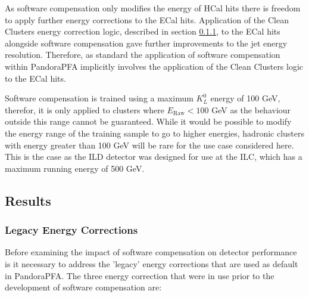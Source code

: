 As software compensation only modifies the energy of HCal \text{ } hits there is freedom to apply further energy corrections to the ECal \text{ } hits.  Application of the Clean Clusters energy correction logic, described in section \ref{sec:legacycorrections}, to the ECal \text{ } hits alongside software compensation gave further improvements to the jet energy resolution.  Therefore, as standard the application of software compensation within PandoraPFA implicitly involves the application of the Clean Clusters logic to the ECal \text{ } hits.  

Software compensation is trained using a maximum $K^{0}_{L}$ energy of 100 GeV, therefor, it is only applied to clusters where $E_{\text{Raw}} < 100$ GeV as the behaviour outside this range cannot be guaranteed.  While it would be possible to modify the energy range of the training sample to go to higher energies, hadronic clusters with energy greater than 100 GeV will be rare for the use case considered here.  This is the case as the ILD detector was designed for use at the ILC, which has a maximum running energy of 500 GeV.  


\subsection{Results}


\subsubsection{Legacy Energy Corrections}
\label{sec:legacycorrections}
Before examining the impact of software compensation on detector performance is it necessary to address the 'legacy' energy corrections that are used as default in PandoraPFA.  The three energy correction that were in use prior to the development of software compensation are:


